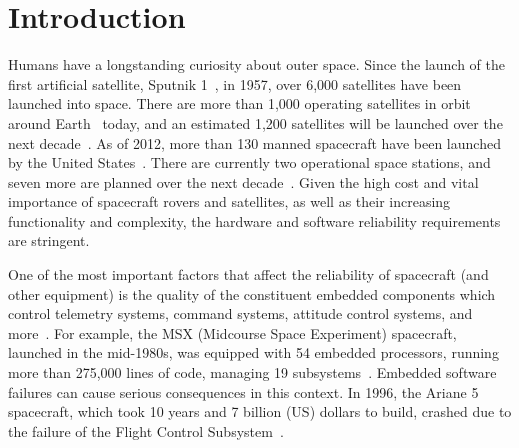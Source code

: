 \vspace{-10pt}
\section{Introduction}\label{sec:introduction}
\vspace{-5pt}
Humans have a longstanding curiosity about outer space. Since the launch of the first artificial satellite, Sputnik 1~\cite{sputnik1}, in 1957, over 6,000 satellites have been launched into space. There are more than 1,000 operating satellites in orbit around Earth~\cite{satellite:total} today, and an estimated 1,200 satellites will be launched over the next decade~\cite{satellite:next10years}. As of 2012, more than 130 manned spacecraft have been launched by the United States~\cite{space:shuttle:list}. There are currently two operational space stations, and seven more are planned over the next decade~\cite{space:station:tiangong2}\cite{space:station:almaz}\cite{space:station:opsek}\cite{space:station:tiangong3}. Given the high cost and vital importance of spacecraft rovers and satellites, as well as their increasing functionality and complexity, the hardware and software reliability requirements are stringent.

One of the most important factors that affect the reliability of spacecraft (and other equipment) is the quality of the constituent embedded components which control telemetry systems, command systems, attitude control systems, and more~\cite{fundamentals:space}. For example, the MSX (Midcourse Space Experiment) spacecraft, launched in the mid-1980s, was equipped with 54 embedded processors, running more than 275,000 lines of code, managing 19 subsystems~\cite{fundamentals:space}. Embedded software failures can cause serious consequences in this context. In 1996, the Ariane 5 spacecraft, which took 10 years and 7 billion (US) dollars to build, crashed due to the failure of the Flight Control Subsystem~\cite{ariane5}.

